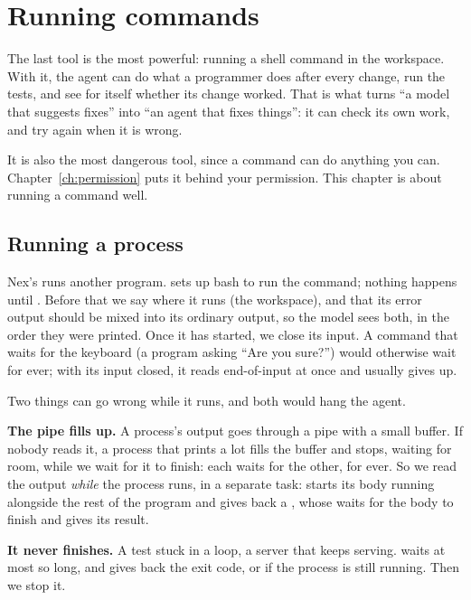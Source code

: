 \chapter{Running commands}\label{ch:commands}

The last tool is the most powerful: running a shell command in the
workspace. With it, the agent can do what a programmer does after every
change, run the tests, and see for itself whether its change worked. That
is what turns ``a model that suggests fixes'' into ``an agent that fixes
things'': it can check its own work, and try again when it is wrong.

It is also the most dangerous tool, since a command can do anything you
can. Chapter~\ref{ch:permission} puts it behind your permission. This
chapter is about running a command well.

\section{Running a process}

Nex's  runs another program.  sets up bash to run the
command; nothing happens until . Before that we say where it
runs (the workspace), and that its error output should be mixed into its
ordinary output, so the model sees both, in the order they were printed.
Once it has started, we close its input. A command that waits for the
keyboard (a program asking ``Are you sure?'') would otherwise wait for
ever; with its input closed, it reads end-of-input at once and usually
gives up.

Two things can go wrong while it runs, and both would hang the agent.

\textbf{The pipe fills up.} A process's output goes through a pipe with a
small buffer. If nobody reads it, a process that prints a lot fills the
buffer and stops, waiting for room, while we wait for it to finish: each
waits for the other, for ever. So we read the output \emph{while} the
process runs, in a separate task:  starts its
body running alongside the rest of the program and gives back a
, whose  waits for the body to finish and gives its
result.

\textbf{It never finishes.} A test stuck in a loop, a server that keeps
serving.  waits at most so long, and gives back the
exit code, or  if the process is still running. Then we stop it.

